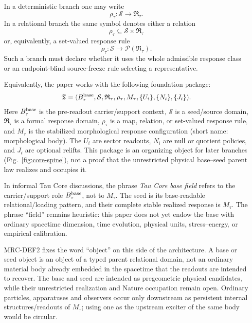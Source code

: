 \documentclass[11pt]{article}
\newcommand{\Ssrc}{\mathcal S}
\newcommand{\RTspace}{\mathfrak R_{\tau}}
\newcommand{\Rmap}{\rho_{\tau}}
\newcommand{\Mta}{M_{\tau}}
\begin{document}
In a deterministic branch one may write
\[
  \Rmap:\Ssrc\to\RTspace.
\]
In a relational branch the same symbol denotes either a relation
\[
  \Rmap\subseteq \Ssrc\times\RTspace
\]
or, equivalently, a set-valued response rule
\[
  \Rmap:\Ssrc\to\mathcal P(\RTspace).
\]
Such a branch must declare whether it uses the whole admissible response class
or an endpoint-blind source-freeze rule selecting a representative.

Equivalently, the paper works with the following foundation package:
\[
  \mathfrak T
  =
  (B_\tau^{\rm base},\Ssrc,\RTspace,\Rmap,\Mta,
   \{U_i\},\{N_i\},\{J_i\}).
\]
Here \(B_\tau^{\rm base}\) is the pre-readout carrier/support context,
\(\Ssrc\) is a seed/source domain, \(\RTspace\) is a formal response domain,
\(\Rmap\) is a map, relation, or set-valued response rule, and \(\Mta\) is
the stabilized morphological response configuration (short name:
morphological body).  The \(U_i\) are sector readouts, \(N_i\) are null or
quotient policies, and \(J_i\) are optional relifts.  This package is an
organizing object for later branches (Fig.~\ref{fig:core-spine}), not a proof
that the unrestricted physical base--seed parent law realizes and occupies it.

In informal Tau Core discussions, the phrase \emph{Tau Core base field} refers
to the carrier/support role \(B_\tau^{\rm base}\), not to \(\Mta\).  The seed
is its base-readable relational/loading pattern, and their complete stable
realized response is \(\Mta\).  The phrase ``field'' remains heuristic: this
paper does not yet endow the base with ordinary spacetime dimension, time
evolution, physical units, stress--energy, or empirical calibration.

MRC-DEF2 fixes the word ``object'' on this side of the architecture. A base
or seed object is an object of a typed parent relational domain, not an
ordinary material body already embedded in the spacetime that the readouts
are intended to recover. The base and seed are intended as pregeometric
physical candidates, while their unrestricted realization and Nature
occupation remain open. Ordinary particles, apparatuses and observers occur
only downstream as persistent internal structures/readouts of \(\Mta\); using
one as the upstream exciter of the same body would be circular.
\end{document}
